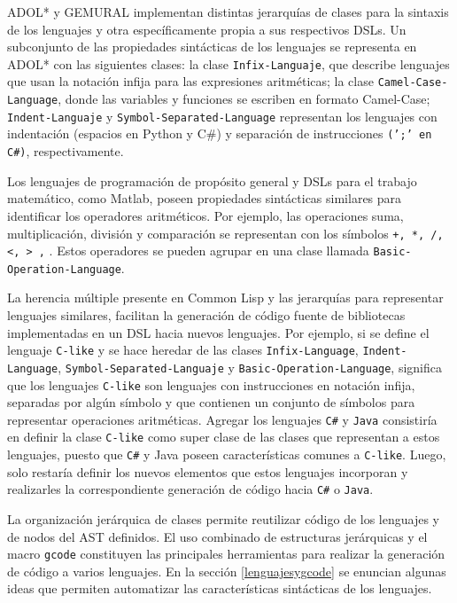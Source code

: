 ADOL* y GEMURAL\cite{gemural} implementan distintas jerarquías de clases para la sintaxis de los lenguajes y otra específicamente propia a sus respectivos DSLs. Un subconjunto de las propiedades sintácticas de los lenguajes se representa en ADOL* con las siguientes clases: la clase \texttt{Infix-Languaje}, que describe lenguajes que usan la notación infija para las expresiones aritméticas; la clase \texttt{Camel-Case-Language}, donde las variables y funciones se escriben en formato Camel-Case; \texttt{Indent-Languaje} y \texttt{Symbol-Separated-Language} representan los lenguajes con indentación (espacios en Python y C\#) y separación de instrucciones \texttt{(';' en C\#)}, respectivamente. 

Los lenguajes de programación de propósito general y DSLs para el trabajo matemático, como Matlab, poseen propiedades sintácticas similares para identificar los operadores aritméticos. Por ejemplo, las operaciones suma, multiplicación, división y comparación se representan con los símbolos \texttt{+, *, /, <, > ,} . Estos operadores se pueden agrupar en una clase llamada \texttt{Basic-Operation-Language}.

La herencia múltiple presente en Common Lisp y las jerarquías para representar lenguajes similares, facilitan la generación de código fuente de bibliotecas implementadas en un DSL hacia nuevos lenguajes. Por ejemplo, si se define el lenguaje \texttt{C-like} y se hace heredar de las clases \texttt{Infix-Language}, \texttt{Indent-Language}, \texttt{Symbol-Separated-Languaje} y \texttt{Basic-Operation-Language}, significa que los lenguajes \texttt{C-like} son lenguajes con instrucciones en notación infija, separadas por algún símbolo y que contienen un conjunto de símbolos para representar operaciones aritméticas. Agregar los lenguajes \texttt{C\#} y \texttt{Java} consistiría en definir la clase \texttt{C-like} como super clase de las clases que representan a estos lenguajes, puesto que \texttt{C\#} y Java poseen características comunes a \texttt{C-like}. Luego, solo restaría definir los nuevos elementos que estos lenguajes incorporan y realizarles la correspondiente generación de código hacia \texttt{C\#} o \texttt{Java}.

La organización jerárquica de clases permite reutilizar código de los lenguajes y de nodos del AST definidos. El uso combinado de estructuras jerárquicas y el macro \texttt{gcode} constituyen las principales herramientas para realizar la generación de código a varios lenguajes. En la sección \ref{lenguajesygcode} se enuncian algunas ideas que permiten automatizar las características sintácticas de los lenguajes.

